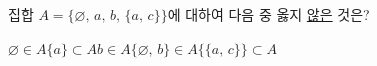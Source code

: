 집합 $A=\{\varnothing,\,a,\,b,\,\{a,\,c\}\}$에 대하여 다음 중 옳지 \underline{않은} 것은?
\begin{choices32}{$\varnothing\in A$}{$\{a\}\subset A$}{$b\in A$}{$\{\varnothing,\,b\}\in A$}{$\{\{a,\,c\}\}\subset A$}\end{choices32}
